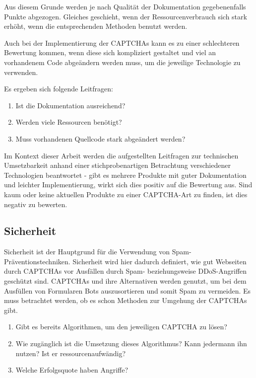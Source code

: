 Aus diesem Grunde werden je nach Qualität der Dokumentation gegebenenfalls Punkte abgezogen.
Gleiches geschieht, wenn der Ressourcenverbrauch sich stark erhöht, wenn die entsprechenden Methoden benutzt werden.

Auch bei der Implementierung der CAPTCHAs kann es zu einer schlechteren Bewertung kommen, wenn diese sich kompliziert gestaltet und viel an vorhandenem Code abgeändern werden muss,
um die jeweilige Technologie zu verwenden.

Es ergeben sich folgende Leitfragen:
\begin{enumerate}
    \item Ist die Dokumentation ausreichend? 
    \item Werden viele Ressourcen benötigt?
    \item Muss vorhandenen Quellcode stark abgeändert werden?
\end{enumerate}

Im Kontext dieser Arbeit werden die aufgestellten Leitfragen zur technischen Umsetzbarkeit anhand einer stichprobenartigen Betrachtung verschiedener 
Technologien beantwortet - gibt es mehrere Produkte mit guter Dokumentation und leichter Implementierung,
wirkt sich dies positiv auf die Bewertung aus.
Sind kaum oder keine aktuellen Produkte zu einer CAPTCHA-Art zu finden, ist dies negativ zu bewerten.

\subsection{Sicherheit}
\label{ch:matrix:aspekte:sicherheit}
Sicherheit ist der Hauptgrund für die Verwendung von Spam-Präventions\-techniken.
Sicherheit wird hier dadurch definiert, wie gut Webseiten durch CAPTCHAs vor Ausfällen durch Spam- beziehungsweise DDoS-Angriffen geschützt sind.
CAPTCHAs und ihre Alternativen werden genutzt, um bei dem Ausfüllen von Formularen Bots auszusortieren und somit Spam zu vermeiden.
Es muss betrachtet werden, ob es schon Methoden zur Umgehung der CAPTCHAs gibt.
\begin{enumerate}
    \item Gibt es bereits Algorithmen, um den jeweiligen CAPTCHA zu lösen?
    \item Wie zugänglich ist die Umsetzung dieses Algorithmus? Kann jedermann ihn nutzen? Ist er ressourcenaufwändig?
    \item Welche Erfolgsquote haben Angriffe?
\end{enumerate}

